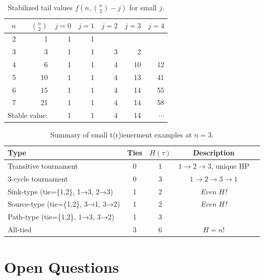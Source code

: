 \documentclass[12pt,reqno]{amsart}
\theoremstyle{definition}
\theoremstyle{plain}
\begin{document}
\begin{table}[ht]
\centering
\caption{Stabilized tail values $f(n,\binom{n}{2}-j)$ for small $j$.}
\label{tab:tail-values}
\begin{tabular}{r r r r r r r}
\toprule
$n$ & $\binom{n}{2}$ & $j=0$ & $j=1$ & $j=2$ & $j=3$ & $j=4$\\
\midrule
2 &  1 & 1 & 1 &  &  &  \\
3 &  3 & 1 & 1 & 3 & 2 & \\
4 &  6 & 1 & 1 & 4 & 10 & 12\\
5 & 10 & 1 & 1 & 4 & 13 & 41\\
6 & 15 & 1 & 1 & 4 & 14 & 55\\
7 & 21 & 1 & 1 & 4 & 14 & 58\\
\bottomrule
\multicolumn{2}{l}{Stable value:} & 1 & 1 & 4 & 14 & $\cdots$\\
\bottomrule
\end{tabular}
\end{table}

\begin{table}[ht]
\centering
\caption{Summary of small t(r)ienerment examples at $n=3$.}
\label{tab:n3-examples}
\begin{tabular}{lcccc}
\toprule
Type & Ties & $H(\tau)$ & Description\\
\midrule
Transitive tournament & 0 & 1 & $1\to2\to3$, unique HP\\
3-cycle tournament    & 0 & 3 & $1\to2\to3\to1$\\
Sink-type (tie=\{1,2\}, 1→3, 2→3)  & 1 & 2 & \emph{Even $H$!} \\
Source-type (tie=\{1,2\}, 3→1, 3→2) & 1 & 2 & \emph{Even $H$!}\\
Path-type (tie=\{1,2\}, 1→3, 3→2)   & 1 & 3 & \\
All-tied              & 3 & 6 & $H=n!$\\
\bottomrule
\end{tabular}
\end{table}

\section{Open Questions}
\label{sec:open}
\end{document}
